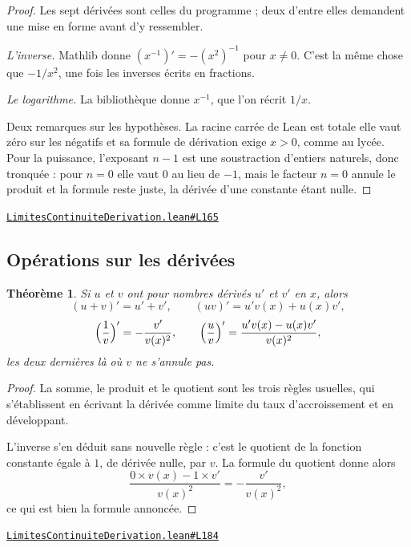 \documentclass[11pt,a4paper]{article}
\theoremstyle{definition}
\theoremstyle{plain}
\newtheorem{theoreme}{Théorème}
\newcommand{\source}[2]{\par\smallskip\noindent\hfill{\footnotesize\href{#1}{\texttt{#2}}}\par\smallskip}
\begin{document}
\begin{proof}
Les sept dérivées sont celles du programme ; deux d'entre elles demandent une mise en
forme avant d'y ressembler.

\smallskip\noindent
\emph{L'inverse.} Mathlib donne $(x^{-1})' = -(x^{2})^{-1}$ pour $x \ne 0$. C'est la même
chose que $-1/x^{2}$, une fois les inverses écrits en fractions.

\smallskip\noindent
\emph{Le logarithme.} La bibliothèque donne $x^{-1}$, que l'on récrit $1/x$.

\smallskip\noindent
Deux remarques sur les hypothèses. La racine carrée de Lean est totale \textemdash{} elle
vaut zéro sur les négatifs \textemdash{} et sa formule de dérivation exige $x > 0$, comme
au lycée. Pour la puissance, l'exposant $n - 1$ est une soustraction d'entiers naturels,
donc tronquée : pour $n = 0$ elle vaut $0$ au lieu de $-1$, mais le facteur $n = 0$ annule
le produit et la formule reste juste, la dérivée d'une constante étant nulle.
\end{proof}
\source{https://github.com/Commutator-IO/learn-lean/blob/main/courses/02-lycee/04-limites-continuite-derivation/LimitesContinuiteDerivation.lean\#L165}{LimitesContinuiteDerivation.lean\#L165}

\subsection{Opérations sur les dérivées}

\begin{theoreme}
Si $u$ et $v$ ont pour nombres dérivés $u'$ et $v'$ en $x$, alors
\[ (u + v)' = u' + v', \qquad (uv)' = u'v(x) + u(x)v', \]
\[ \Bigl(\frac{1}{v}\Bigr)' = -\frac{v'}{v(x)^{2}}, \qquad
   \Bigl(\frac{u}{v}\Bigr)' = \frac{u'v(x) - u(x)v'}{v(x)^{2}}, \]
les deux dernières là où $v$ ne s'annule pas.
\end{theoreme}

\begin{proof}
La somme, le produit et le quotient sont les trois règles usuelles, qui s'établissent en
écrivant la dérivée comme limite du taux d'accroissement et en développant.

L'inverse s'en déduit sans nouvelle règle : c'est le quotient de la fonction constante
égale à $1$, de dérivée nulle, par $v$. La formule du quotient donne alors
\[ \frac{0 \times v(x) - 1 \times v'}{v(x)^{2}} = -\frac{v'}{v(x)^{2}} , \]
ce qui est bien la formule annoncée.
\end{proof}
\source{https://github.com/Commutator-IO/learn-lean/blob/main/courses/02-lycee/04-limites-continuite-derivation/LimitesContinuiteDerivation.lean\#L184}{LimitesContinuiteDerivation.lean\#L184}
\end{document}
